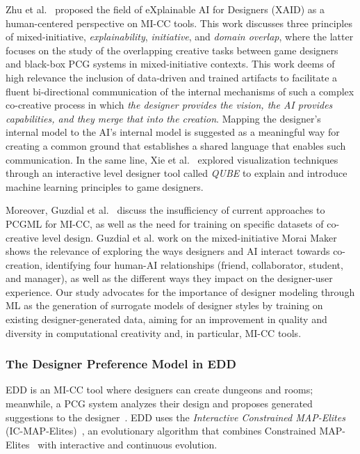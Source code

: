 Zhu et al.~ proposed the field of eXplainable AI for Designers (XAID) as a human-centered perspective on MI-CC tools. This work discusses three principles of mixed-initiative, \emph{explainability}, \emph{initiative}, and \emph{domain overlap}, where the latter focuses on the study of the overlapping creative tasks between game designers and black-box PCG systems in mixed-initiative contexts. This work deems of high relevance the inclusion of data-driven and trained artifacts to facilitate a fluent bi-directional communication of the internal mechanisms of such a complex co-creative process in which \textit{the designer provides the vision, the AI provides capabilities, and they merge that into the creation}. Mapping the designer's internal model to the AI's internal model is suggested as a meaningful way for creating a common ground that establishes a shared language that enables such communication. In the same line, Xie et al.~ explored visualization techniques through an interactive level designer tool called \textit{QUBE} to explain and introduce machine learning principles to game designers.

Moreover, Guzdial et al.~ discuss the insufficiency of current approaches to PCGML for MI-CC, as well as the need for training on specific datasets of co-creative level design. Guzdial et al. work on the mixed-initiative Morai Maker~ shows the relevance of exploring the ways designers and AI interact towards co-creation, identifying four human-AI relationships (friend, collaborator, student, and manager), as well as the different ways they impact on the designer-user experience. Our study advocates for the importance of designer modeling through ML as the generation of surrogate models of designer styles by training on existing designer-generated data, aiming for an improvement in quality and diversity in computational creativity and, in particular, MI-CC tools. 

\subsubsection{The Designer Preference Model in EDD}

EDD is an MI-CC tool where designers can create dungeons and rooms; meanwhile, a PCG system analyzes their design and proposes generated suggestions to the designer~. EDD uses the \emph{Interactive Constrained MAP-Elites} (IC-MAP-Elites)~, an evolutionary algorithm that combines Constrained MAP-Elites~ with interactive and continuous evolution. 

